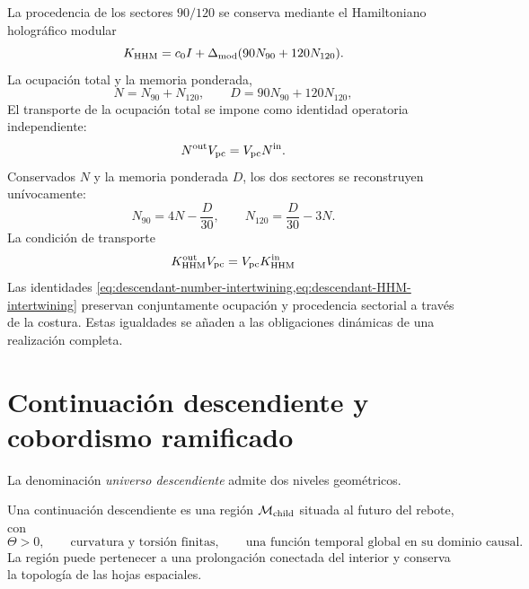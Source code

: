 La procedencia de los sectores \(90/120\) se conserva mediante el
Hamiltoniano hologr\'afico modular
\begin{equation}
 K_{\rm HHM}=c_0I+\Delta_{\rm mod}
 (90N_{90}+120N_{120}).
 \label{eq:descendant-HHM}
\end{equation}
La ocupaci\'on total y la memoria ponderada,
\begin{equation}
 N=N_{90}+N_{120},
 \qquad
 D=90N_{90}+120N_{120},
 \label{eq:descendant-HHM-data}
\end{equation}
El transporte de la ocupaci\'on total se impone como identidad operatoria
independiente:
\begin{equation}
 N^{\rm out}V_{\rm pc}=V_{\rm pc}N^{\rm in}.
 \label{eq:descendant-number-intertwining}
\end{equation}
Conservados \(N\) y la memoria ponderada \(D\), los dos sectores se
reconstruyen un\'ivocamente:
\begin{equation}
 N_{90}=4N-\frac D{30},
 \qquad
 N_{120}=\frac D{30}-3N.
 \label{eq:descendant-HHM-recovery}
\end{equation}
La condici\'on de transporte
\begin{equation}
 K_{\rm HHM}^{\rm out}V_{\rm pc}
 =V_{\rm pc}K_{\rm HHM}^{\rm in}
 \label{eq:descendant-HHM-intertwining}
\end{equation}
Las identidades
\cref{eq:descendant-number-intertwining,eq:descendant-HHM-intertwining}
preservan conjuntamente ocupaci\'on y procedencia sectorial a trav\'es de la
costura. Estas igualdades se a\~naden a las obligaciones din\'amicas de una
realizaci\'on completa.

\section{Continuaci\'on descendiente y cobordismo ramificado}

La denominaci\'on \emph{universo descendiente} admite dos niveles
geom\'etricos.

\begin{definition}
\label{def:descendant-minimal}
Una continuaci\'on descendiente es una regi\'on
\(\mathcal M_{\rm child}\) situada al futuro del rebote, con
\begin{equation}
 \Theta>0,
 \qquad
 \text{curvatura y torsi\'on finitas},
 \qquad
 \text{una funci\'on temporal global en su dominio causal}.
 \label{eq:descendant-minimal-conditions}
\end{equation}
La regi\'on puede pertenecer a una prolongaci\'on conectada del interior y
conserva la topolog\'ia de las hojas espaciales.
\end{definition}

